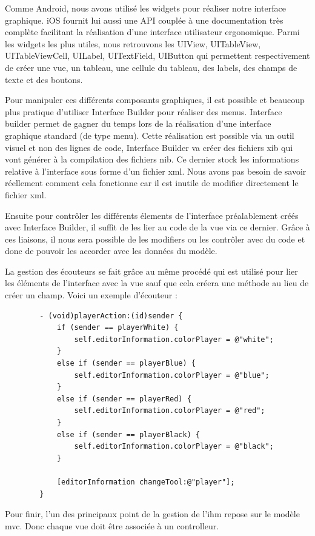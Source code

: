 	Comme Android, nous avons utilisé les widgets pour réaliser notre interface graphique. iOS fournit lui aussi une API couplée à une documentation très complète facilitant la réalisation d'une interface utilisateur ergonomique. Parmi les widgets les plus utiles, nous retrouvons les UIView, UITableView, UITableViewCell, UILabel, UITextField, UIButton qui permettent respectivement de créer une vue, un tableau, une cellule du tableau, des labels, des champs de texte et des boutons.
	
	Pour manipuler ces différents composants graphiques, il est possible et beaucoup plus pratique d'utiliser Interface Builder pour réaliser des menus. Interface builder permet de gagner du temps lors de la réalisation d'une interface graphique standard (de type menu). Cette réalisation est possible via un outil visuel et non des lignes de code,  Interface Builder va créer des fichiers \gls{xib} qui vont générer à la compilation des fichiers \gls{nib}. Ce dernier stock les informations relative à l'interface sous forme d'un fichier \gls{xml}. Nous avons pas besoin de savoir réellement comment cela fonctionne car il est inutile de modifier directement le fichier \gls{xml}.
	
	Ensuite pour contrôler les différents élements de l'interface préalablement créés avec Interface Builder, il suffit de les lier au code de la vue via ce dernier. Grâce à ces liaisons, il nous sera possible de les modifiers ou les contrôler avec du code et donc de pouvoir les accorder avec les données du modèle.
	
	La gestion des écouteurs se fait grâce au même procédé qui est utilisé pour lier les éléments de l'interface avec la vue sauf que cela créera une méthode au lieu de créer un champ. Voici un exemple d'écouteur :
	
	\begin{verbatim}
		- (void)playerAction:(id)sender {
		    if (sender == playerWhite) {
		        self.editorInformation.colorPlayer = @"white";
		    }
		    else if (sender == playerBlue) {
		        self.editorInformation.colorPlayer = @"blue";
		    }
		    else if (sender == playerRed) {
		        self.editorInformation.colorPlayer = @"red";
		    }
		    else if (sender == playerBlack) {
		        self.editorInformation.colorPlayer = @"black";
		    }
    
		    [editorInformation changeTool:@"player"];
		}
	\end{verbatim}
	
	Pour finir, l'un des principaux point de la gestion de l'\gls{ihm} repose sur le modèle \gls{mvc}. Donc chaque vue doit être associée à un controlleur.
				
